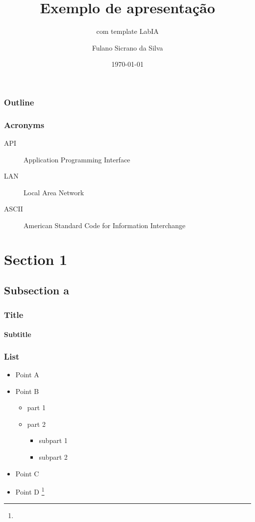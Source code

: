 \documentclass[aspectratio=169]{beamer}
\title{Exemplo de apresentação}
\subtitle{com template LabIA}
\author{Fulano Sicrano da Silva}
\institute{Universidade Federal da Bahia - UFBA}
\date{\today}
\begin{document}
\begin{frame}
    \titlepage
\end{frame}

\begin{frame}
    \frametitle{Outline}
    \label{contents}
    \tableofcontents
\end{frame}

\begin{frame}
    \frametitle{Acronyms}
    \label{acronyms}
    \begin{description}
        \item[API] Application Programming Interface
        \item[LAN] Local Area Network
        \item[ASCII] American Standard Code for Information Interchange
    \end{description}
\end{frame}

\section{Section 1}
\subsection{Subsection a}

\begin{frame}
    \frametitle{Title}
    \framesubtitle{Subtitle}
    \lipsum[1][1-9]
\end{frame}

\begin{frame}
    \frametitle{List}
    \begin{itemize}
        \item Point A
        \item Point B
        \begin{itemize}
            \item part 1
            \item part 2
            \begin{itemize}
                \item subpart 1
                \item subpart 2
            \end{itemize}
        \end{itemize}
        \item Point C
        \item Point D \footnote{\lipsum[1][1]}
    \end{itemize}
\end{frame}
\end{document}
